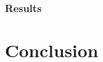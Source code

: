 \documentclass[11pt]{article}
\begin{document}
\subsubsection{Results}

\section{Conclusion}
\end{document}
